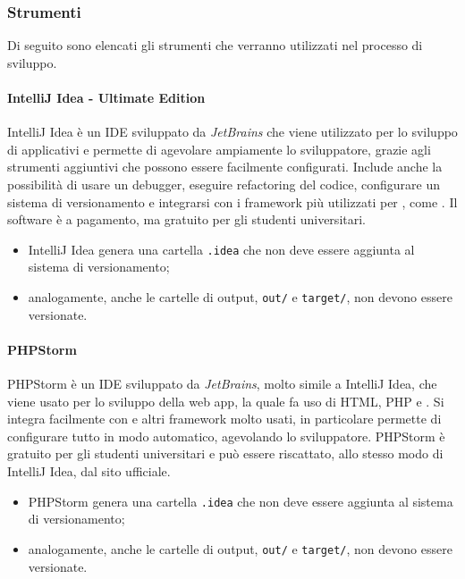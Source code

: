 		\subsubsection{Strumenti}
			Di seguito sono elencati gli strumenti che verranno utilizzati nel processo di sviluppo.
							
				\paragraph{IntelliJ Idea - Ultimate Edition}
					IntelliJ Idea è un IDE sviluppato da \textit{JetBrains} che viene utilizzato per lo sviluppo di applicativi  e permette di agevolare ampiamente lo sviluppatore, grazie agli strumenti aggiuntivi che possono essere facilmente configurati.
					\newline
					Include anche la possibilità di usare un debugger, eseguire refactoring del codice, configurare un sistema di versionamento e integrarsi con i framework più utilizzati per , come .
					\newline
					Il software è a pagamento, ma gratuito per gli studenti universitari. 

					\begin{itemize}
						\item IntelliJ Idea genera una cartella \verb!.idea! che non deve essere aggiunta al sistema di versionamento;
						\item analogamente, anche le cartelle di output, \verb!out/! e \verb!target/!, non devono essere versionate.
					\end{itemize}

				\paragraph{PHPStorm}
					PHPStorm è un IDE sviluppato da \textit{JetBrains}, molto simile a IntelliJ Idea, che viene usato per lo sviluppo della web app, la quale fa uso di HTML, PHP e . 
					\newline
					Si integra facilmente con  e altri framework molto usati, in particolare permette di configurare tutto in modo automatico, agevolando lo sviluppatore. 
					\newline
					PHPStorm è gratuito per gli studenti universitari e può essere riscattato, allo stesso modo di IntelliJ Idea, dal sito ufficiale. 

					\begin{itemize}
						\item PHPStorm genera una cartella \verb!.idea! che non deve essere aggiunta al sistema di versionamento;
						\item analogamente, anche le cartelle di output, \verb!out/! e \verb!target/!, non devono essere versionate.
					\end{itemize}
				
